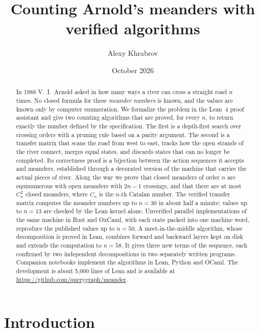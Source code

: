 \documentclass[11pt]{amsart}
\title{Counting Arnold's meanders with verified algorithms}
\author{Alexy Khrabrov}
\date{October 2026}
\theoremstyle{definition}
\theoremstyle{remark}
\begin{document}
\begin{abstract}
In 1988 V.~I.~Arnold asked in how many ways a river can cross a straight road $n$ times.
No closed formula for these \emph{meander numbers} is known, and the values are known only
by computer enumeration. We formalize the problem in the Lean~4 proof assistant and give two
counting algorithms that are proved, for every $n$, to return exactly the number defined by
the specification. The first is a depth-first search over crossing orders with a pruning rule
based on a parity argument. The second is a transfer matrix that scans the road from west to
east, tracks how the open strands of the river connect, merges equal states, and discards
states that can no longer be completed. Its correctness proof is a bijection between the
action sequences it accepts and meanders, established through a decorated version of the
machine that carries the actual pieces of river. Along the way we prove that closed meanders
of order $n$ are equinumerous with open meanders with $2n-1$ crossings, and that there are at
most $C_n^2$ closed meanders, where $C_n$ is the $n$-th Catalan number. The verified transfer
matrix computes the meander numbers up to $n=30$ in about half a minute; values up to $n=13$
are checked by the Lean kernel alone. Unverified parallel implementations of the same machine
in Rust and OxCaml, with each state packed into one machine word, reproduce the published values
up to $n = 50$. A meet-in-the-middle algorithm, whose decomposition is proved in Lean, combines
forward and backward layers kept on disk and extends the computation to $n = 58$. It gives three
new terms of the sequence, each confirmed by two independent decompositions in two separately
written programs. Companion notebooks implement the algorithms in Lean, Python and OCaml. The
development is about 5{,}000 lines of Lean and is available at
\url{https://github.com/querygraph/meander}.
\end{abstract}

\maketitle

\section{Introduction}
\end{document}
